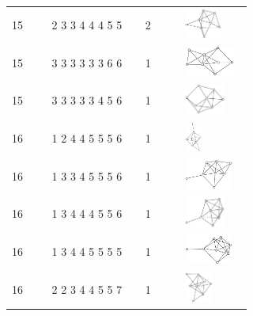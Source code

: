 \begin{table}[h!]
\begin{tabular}{m{0.15\linewidth} m{0.35\linewidth} m{0.15\linewidth} m{0.25\linewidth}}
15 & 2 3 3 4 4 4 5 5 & 2 & \includegraphics[height=1cm]{15-universal-graphs/img/degree-sequences-example-graphs/graph-4-8-127}\\
15 & 3 3 3 3 3 3 6 6 & 1 & \includegraphics[height=1cm]{15-universal-graphs/img/degree-sequences-example-graphs/graph-4-8-128}\\
15 & 3 3 3 3 3 4 5 6 & 1 & \includegraphics[height=1cm]{15-universal-graphs/img/degree-sequences-example-graphs/graph-4-8-129}\\
16 & 1 2 4 4 5 5 5 6 & 1 & \includegraphics[height=1cm]{15-universal-graphs/img/degree-sequences-example-graphs/graph-4-8-130}\\
16 & 1 3 3 4 5 5 5 6 & 1 & \includegraphics[height=1cm]{15-universal-graphs/img/degree-sequences-example-graphs/graph-4-8-131}\\
16 & 1 3 4 4 4 5 5 6 & 1 & \includegraphics[height=1cm]{15-universal-graphs/img/degree-sequences-example-graphs/graph-4-8-132}\\
16 & 1 3 4 4 5 5 5 5 & 1 & \includegraphics[height=1cm]{15-universal-graphs/img/degree-sequences-example-graphs/graph-4-8-133}\\
16 & 2 2 3 4 4 5 5 7 & 1 & \includegraphics[height=1cm]{15-universal-graphs/img/degree-sequences-example-graphs/graph-4-8-134}\\

\end{tabular}
\end{table}
